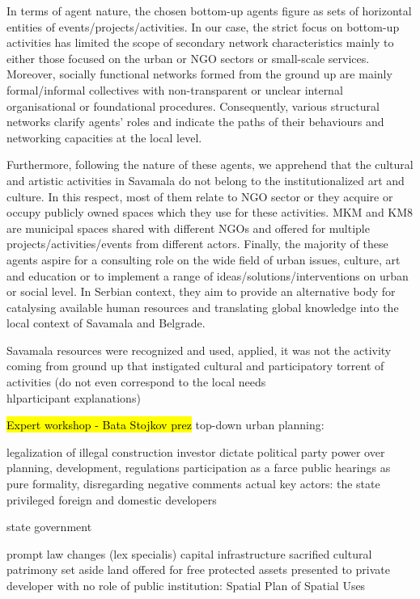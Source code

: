 \documentclass[11pt]{report}
\begin{document}
In terms of agent nature, the chosen bottom-up agents figure as sets of horizontal entities of events/projects/activities. In our case, the strict focus on bottom-up activities has limited the scope of secondary network characteristics mainly to either those focused on the urban or NGO sectors or small-scale services. Moreover, socially functional networks formed from the ground up are mainly formal/informal collectives with non-transparent or unclear internal organisational or foundational procedures. Consequently, various structural networks clarify agents’ roles and indicate the paths of their behaviours and networking capacities at the local level.

Furthermore, following the nature of these agents, we apprehend that the cultural and artistic activities in Savamala do not belong to the institutionalized art and culture. In this respect, most of them relate to NGO sector or they acquire or occupy publicly owned spaces which they use for these activities. MKM and KM8 are municipal spaces shared with different NGOs and offered for multiple projects/activities/events from different actors. Finally, the majority of these agents aspire for a consulting role on the wide field of urban issues, culture, art and education or to implement a range of ideas/solutions/interventions on urban or social level. In Serbian context, they aim to provide an alternative body for catalysing available human resources and translating global knowledge into the local context of Savamala and Belgrade.

Savamala resources were recognized and used, applied, it was not the activity coming from ground up that instigated cultural and participatory torrent of activities (do not even correspond to the local needs \\hl{participant explanations})

\hl{Expert workshop - Bata Stojkov prez}
top-down urban planning:

    legalization of illegal construction
    investor dictate
    political party power over planning, development, regulations
    participation as a farce
    public hearings as pure formality, disregarding negative comments
    actual key actors:
        the state
        privileged foreign and domestic developers

    state government

    prompt law changes (lex specialis)
    capital infrastructure sacrified
    cultural patrimony set aside
    land offered for free
    protected assets presented to private developer with no role of public institution: Spatial Plan of Spatial Uses
\end{document}

